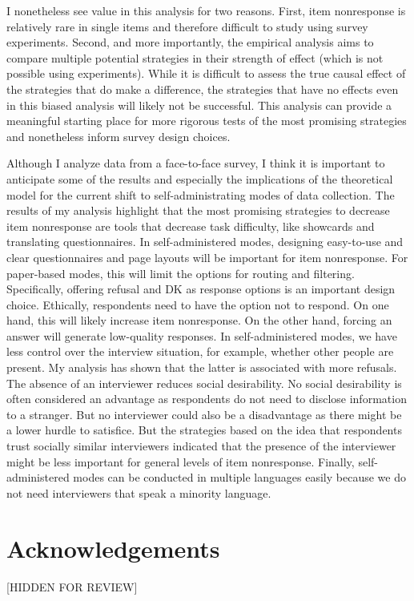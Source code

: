 \documentclass[a4paper,12pt]{article}
\begin{document}
I nonetheless see value in this analysis for two reasons. First, item nonresponse is relatively rare in single items and therefore difficult to study using survey experiments. Second, and more importantly, the empirical analysis aims to compare multiple potential strategies in their strength of effect (which is not possible using experiments). While it is difficult to assess the true causal effect of the strategies that do make a difference, the strategies that have no effects even in this biased analysis will likely not be successful. This analysis can provide a meaningful starting place for more rigorous tests of the most promising strategies and nonetheless inform survey design choices.

Although I analyze data from a face-to-face survey, I think it is important to anticipate some of the results and especially the implications of the theoretical model for the current shift to self-administrating modes of data collection. The results of my analysis highlight that the most promising strategies to decrease item nonresponse are tools that decrease task difficulty, like showcards and translating questionnaires. In self-administered modes, designing easy-to-use and clear questionnaires and page layouts will be important for item nonresponse. For paper-based modes, this will limit the options for routing and filtering. Specifically, offering refusal and DK as response options is an important design choice. Ethically, respondents need to have the option not to respond. On one hand, this will likely increase item nonresponse. On the other hand, forcing an answer will generate low-quality responses. In self-administered modes, we have less control over the interview situation, for example, whether other people are present. My analysis has shown that the latter is associated with more refusals. The absence of an interviewer reduces social desirability. No social desirability is often considered an advantage as respondents do not need to disclose information to a stranger. But no interviewer could also be a disadvantage as there might be a lower hurdle to satisfice. But the strategies based on the idea that respondents trust socially similar interviewers indicated that the presence of the interviewer might be less important for general levels of item nonresponse. Finally, self-administered modes can be conducted in multiple languages easily because we do not need interviewers that speak a minority language.


\section*{Acknowledgements}

[HIDDEN FOR REVIEW]



\singlespacing
\printbibliography
\end{document}

